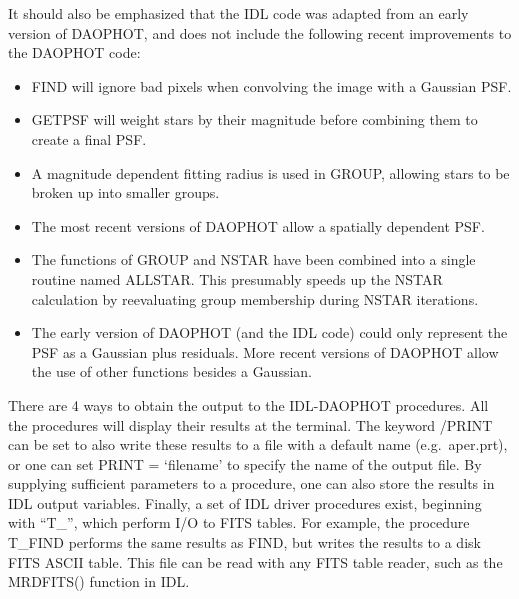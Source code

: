 It should also be emphasized that the IDL code was adapted from an early
version of DAOPHOT, and does not include the following recent improvements
to the DAOPHOT code:

\begin{itemize}
\item FIND will ignore bad pixels when convolving the image with
           a Gaussian PSF. 

\item GETPSF will weight stars by their magnitude before combining
           them to create a final PSF.
      
\item A magnitude dependent fitting radius is used in GROUP, allowing
           stars to be broken up into smaller groups.

\item The most recent versions of DAOPHOT allow a spatially dependent
           PSF.

\item The functions of GROUP and NSTAR have been combined into a single
routine named ALLSTAR.  This presumably speeds up the NSTAR calculation
by reevaluating group membership during NSTAR iterations.

\item The early version of DAOPHOT (and the IDL code) could only represent
the PSF as a Gaussian plus residuals.    More recent versions of DAOPHOT
allow the use of other functions besides a Gaussian.

\end{itemize}

There are 4 ways to obtain the output to the IDL-DAOPHOT procedures.  All
the procedures will display their results at the terminal.    The keyword
/PRINT can be set to also write these results to a file with a default name
(e.g.\ aper.prt), or one can set PRINT = `filename' to specify the name of
the output file. 
By supplying sufficient parameters to a procedure, one can
also store the results in IDL output variables.  Finally, a set of IDL
driver procedures exist, beginning with ``T\_'', which perform I/O to FITS 
tables.  For example, the procedure T\_FIND performs the same results as
FIND, but writes the results to a disk FITS ASCII table.     This file can
be read with any FITS table reader, such as the MRDFITS() function in IDL.
  
